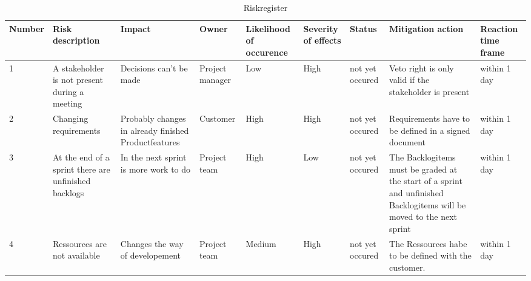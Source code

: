 \begin{table}[]
\centering
\caption{Riskregister}
\label{my-label}
\begin{tabular}{|l|l|l|l|l|l|l|l|l|}
\hline
\textbf{Number} & \textbf{Risk description}                            & \textbf{Impact}                                      & \textbf{Owner}  & \textbf{Likelihood of occurence} & \textbf{Severity of effects} & \textbf{Status} & \textbf{Mitigation action}                                                                                            & \textbf{Reaction time frame} \\ \hline
1               & A stakeholder is not present during a meeting        & Decisions can't be made                              & Project manager & Low                              & High                         & not yet occured & Veto right is only valid if the stakeholder is present                                                                & within 1 day                 \\ \hline
2               & Changing requirements                                & Probably changes in already finished Productfeatures & Customer        & High                             & High                         & not yet occured & Requirements have to be defined in a signed document                                                                  & within 1 day                 \\ \hline
3               & At the end of a sprint there are unfinished backlogs & In the next sprint is more work to do                & Project team    & High                             & Low                          & not yet occured & The Backlogitems must be graded at the start of a sprint and unfinished Backlogitems will be moved to the next sprint & within 1 day                 \\ \hline
4               & Ressources are not available                         & Changes the way of developement                      & Project team    & Medium                           & High                         & not yet occured & The Ressources habe to be defined with the customer.                                                                  & within 1 day                 \\ \hline
\end{tabular}
\end{table}